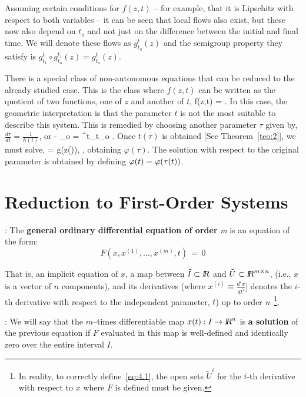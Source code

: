 Assuming certain conditions for $f(z,t) $ -- for example, that it is
Lipschitz with respect to both variables -- it can be seen that local
flows also exist, but these now also depend on $t_o $ and not just
on the difference between the initial and final time. We will denote
these flows as $g^t_{t_o}(z)$ and the semigroup property they satisfy is
$g^{t}_{t_1} \circ g^{t_1}_{t_o} (z) = g^t_{t_o} (z) $.

There is a special class of non-autonomous equations that can be reduced
to the already studied case. This is the class where $f(z,t)$ can be written as
the quotient of two functions, one of $z$ and another of $t$,
\beq 
f(z,t) =  .
\eeq
In this case, the geometric interpretation is that the parameter $t$
is not the most suitable to describe this system. This is remedied by choosing
another parameter $\tau $ given by, $\frac{d\tau}{dt} = \frac1{h(t)}$, or 
\beq 
\tau - \tau_o = \int^t_{t_o} . 
\eeq
Once $t(\tau) $ is obtained [See Theorem~\ref{teo:2}], we must solve,
\beq 
{} = g(z(\tau )), 
, obtaining $\varphi(\tau) $.
The solution with respect to the original parameter is obtained 
by defining $\mbox{$\varphi (t)$} = \varphi(\tau(t)) $.

\section{Reduction to First-Order Systems}

: The {\bf general ordinary differential equation of order} {\it m} 
is an equation of the form:
\begin{equation}
F(x,x^{(1)},\ldots,x^{(m)},t)\,=\,0     \label{eq:4.1}
\end{equation}
\noindent 

That is, an implicit equation of $x$, a map between 
$\tilde I\subset \mbox{\sl {l$\!\!\!\;\:\!$R}}$ and $\tilde U\subset \mbox{\sl {l$\!\!\!\;\:\!$R}}^{m \times n}$, (i.e., $x$ is a
vector of $n$ components), and its derivatives (where $x^{(i)} \equiv \frac{d^i x}{dt^i}]$ 
denotes the $i$-th derivative with respect to the independent parameter, $t$) 
up to order 
{\it n}~\footnote{In reality, to correctly define~\ref{eq:4.1}, the open sets $\tilde U^i$ for the $i$-th derivative with respect 
to $x$ where $F$ is defined must be given.}.

: We will say that the $m$--times differentiable map $x(t): I \to
\mbox{\sl {l$\!\!\!\;\:\!$R}}^n$ is {\bf a solution} of the previous equation if $F$
evaluated in this map is well-defined and identically zero over 
the entire interval $I$.

